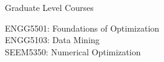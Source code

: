 \begin{rSection}{Graduate Level Courses}

    ENGG5501: Foundations of Optimization \\ 
    ENGG5103: Data Mining \\
    SEEM5350: Numerical Optimization
\end{rSection}
